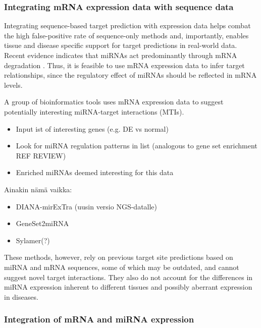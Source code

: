 \subsubsection{Integrating mRNA expression data with sequence data}

Integrating sequence-based target prediction with expression data helps combat the
high false-positive rate of sequence-only methods and, importantly, enables tissue and
disease specific support for target predictions in real-world data. Recent
evidence indicates that miRNAs act predominantly through mRNA degradation
\citep{Guo2010}. Thus, it is feasible to use mRNA expression data to
infer target relationships, since the regulatory effect of miRNAs should be
reflected in mRNA levels.

A group of bioinformatics tools uses mRNA expression data to suggest
potentially interesting miRNA-target interactions (MTIs).
\begin{itemize}
  \item
  Input ist of interesting genes (e.g. DE vs normal)
  \item
  Look for miRNA regulation patterns in list (analogous to gene set enrichment REF REVIEW)
  \item
  Enriched miRNAs deemed interesting for this data
\end{itemize}



Ainakin nämä vaikka:
\begin{itemize}
  \item
  DIANA-mirExTra (uusin versio NGS-datalle)
  \item
  GeneSet2miRNA
  \item
  Sylamer(?)
\end{itemize}

These methods, however, rely on previous target site predictions based on
miRNA and mRNA sequences, some of which may be outdated, and 
cannot suggest novel target interactions. They also do not account for
the differences in miRNA expression inherent to different tissues and
possibly aberrant expression in diseases.


\subsubsection{Integration of mRNA and miRNA expression}

